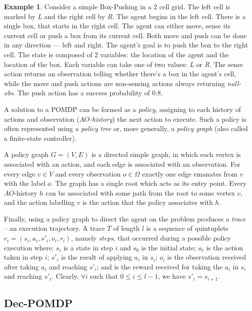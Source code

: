 \documentclass[letterpaper]{article} %
\theoremstyle{definition}
\newtheorem{example}{Example}
\begin{document}
\begin{example}
Consider a simple Box-Pushing in a 2 cell grid. The left cell is marked by \emph{L} and the right cell by \emph{R}. The agent begins in the left cell. There is a single box, that starts in the right cell. The agent can either move, sense its current cell or push a box from its current cell. Both move and push can be done in any direction --- left and right. The agent's goal is to push the box to the right cell.
The state is composed of 2 variables: the location of the agent and the location of the box. Each variable can take one of two values: \emph{L} or \emph{R}.
The sense action returns an observation telling whether there's a box in the agent's cell, while the move and push actions are non-sensing actions always returning {\em null-obs}.
The push action has a success probability of 0.8.
\end{example}

A solution to a POMDP can be formed as a {\em policy}, assigning to each history of actions and observation ({\em $AO$-history}) the next action to execute. 
Such a policy is often represented using a {\em policy tree} or, more generally, a {\em policy graph} (also called a finite-state controller). 

A policy graph $G=(V,E)$ is a directed simple graph, in which each vertex is associated with an action, and each edge is associated with an observation.
For every edge $v\in V$ and every observation $o\in\Omega$ exactly one edge emanates from $v$ with the label $o$.
The graph has a single root which acts as its entry point. Every $AO$-history $h$ can be associated with some path from the root to some vertex $v$,
and the action labelling $v$ is the action that the policy associates with $h$.

Finally, using a policy graph to direct the agent on the problem produces a {\em trace} -- an execution trajectory. A trace $T$ of length $l$ is a sequence of quintuplets $e_i = (s_i, a_i, s'_i, o_i, r_i)$, namely \emph{steps}, that occurred during a possible policy execution where: $s_i$ is a state in step $i$ and $s_0$ is the initial state;
$a_i$ is the action taken in step $i$;
    $s'_i$ is the result of applying $a_i$ in $s_i$;
    $o_i$ is the observation received after taking $a_i$ and reaching $s'_i$; and is the reward received for taking the $a_i$ in $s_i$ and reaching $s'_i$. Clearly, $\forall i$ such
    that $0\leq i \leq l-1$, we have $s'_i=s_{i+1}$.




\subsection{Dec-POMDP}
\end{document}
